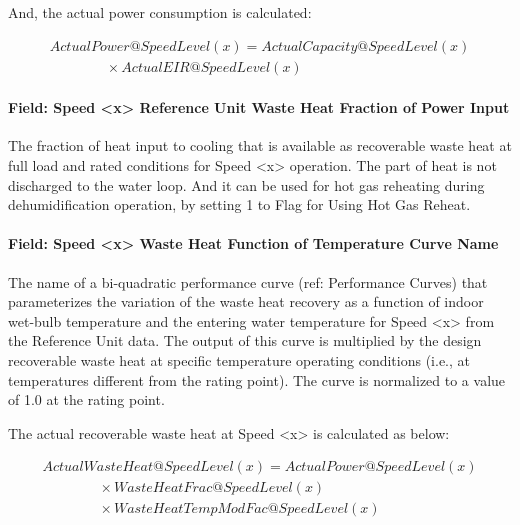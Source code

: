 And, the actual power consumption is calculated:

\begin{equation}
  \begin{array}{l}
    ActualPower@SpeedLevel\left( x \right) = ActualCapacity@SpeedLevel\left( x \right) \\
    \quad \quad \quad \quad  \times ActualEIR@SpeedLevel\left( x \right)
  \end{array}
\end{equation}

\paragraph{Field: Speed \textless{}x\textgreater{} Reference Unit Waste Heat Fraction of Power Input}\label{field-speed-x-reference-unit-waste-heat-fraction-of-power-input}

The fraction of heat input to cooling that is available as recoverable waste heat at full load and rated conditions for Speed \textless{}x\textgreater{} operation. The part of heat is not discharged to the water loop. And it can be used for hot gas reheating during dehumidification operation, by setting 1 to Flag for Using Hot Gas Reheat.

\paragraph{Field: Speed \textless{}x\textgreater{} Waste Heat Function of Temperature Curve Name}\label{field-speed-x-waste-heat-function-of-temperature-curve-name-2}

The name of a bi-quadratic performance curve (ref: Performance Curves) that parameterizes the variation of the waste heat recovery as a function of indoor wet-bulb temperature and the entering water temperature for Speed \textless{}x\textgreater{} from the Reference Unit data. The output of this curve is multiplied by the design recoverable waste heat at specific temperature operating conditions (i.e., at temperatures different from the rating point). The curve is normalized to a value of 1.0 at the rating point.

The actual recoverable waste heat at Speed \textless{}x\textgreater{} is calculated as below:

\begin{equation}
  \begin{array}{l}
    ActualWasteHeat@SpeedLevel\left( x \right) = ActualPower@SpeedLevel\left( x \right) \\
    \quad \quad \quad \quad \times WasteHeatFrac@SpeedLevel(x) \\
    \quad \quad \quad \quad \times WasteHeatTempModFac@SpeedLevel(x)
  \end{array}
\end{equation}

